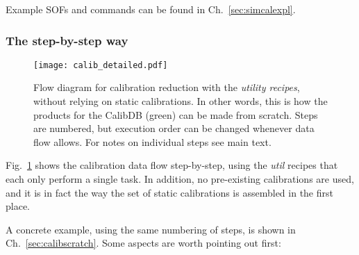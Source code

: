 Example SOFs and commands can be found in Ch.~\ref{sec:simcalexpl}.

\subsubsection{The step-by-step way}
\label{sec:stepcalib}

\begin{figure}[!tb]
    \begin{center}
        \texttt{[image: calib\_detailed.pdf]}
    \end{center}
    \caption{
        \label{fig:calibflow_detailed}
        Flow diagram for calibration reduction with the \textit{utility
            recipes}, without relying on static calibrations. In other
            words, this is how the products for the CalibDB (green) can be made
            from scratch. Steps are numbered, but execution order can be changed
            whenever data flow allows. For notes on individual steps see main
            text.}
\end{figure}

Fig.~\ref{fig:calibflow_detailed} shows the calibration data flow step-by-step,
using the \emph{util} recipes that each only perform a single task. In addition,
no pre-existing calibrations are used, and it is in fact the way the
set of static calibrations is assembled in the first place.

A concrete example, using the same numbering of steps, is shown in
Ch.~\ref{sec:calibscratch}. Some aspects are worth pointing out first:

